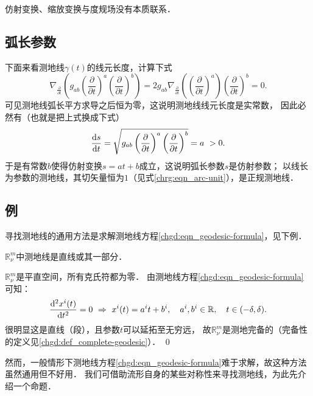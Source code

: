 仿射变换、缩放变换与度规场没有本质联系．

\subsection{弧长参数}
下面来看测地线$\gamma(t)$的线元长度，计算下式
\begin{equation}
    \nabla_{\frac{\partial}{\partial t}} \left(g_{ab} \left(\frac{\partial}{\partial t}\right)^a
    \left(\frac{\partial}{\partial t}\right)^b    \right) =
    2 g_{ab} \nabla_{\frac{\partial}{\partial t}} \left( \left(\frac{\partial}{\partial t}\right)^a \right)
    \left(\frac{\partial}{\partial t}\right)^b     = 0.
\end{equation}
可见测地线弧长平方求导之后恒为零，这说明测地线线元长度是实常数，
因此必然有（也就是把上式换成下式）
\begin{equation}
    \frac{{\rm d}s}{{\rm d}t} =
    \sqrt{g_{ab} \left(\frac{\partial}{\partial t}\right)^a
        \left(\frac{\partial}{\partial t}\right)^b }
    = a \ >0.
\end{equation}
于是有常数$b$使得仿射变换$s=at+b$成立，这说明弧长参数$s$是仿射参数；
以线长为参数的测地线，其切矢量恒为$1$（见式\eqref{chrg:eqn_arc-unit}），是正规测地线．



\subsection{例}
寻找测地线的通用方法是求解测地线方程\eqref{chgd:eqn_geodesic-formula}，见下例．

\begin{example}\label{chgd:exm_Rmnu}
    $\mathbb{R}^m_\nu$中测地线是直线或其一部分．
\end{example}
$\mathbb{R}^m_\nu$是平直空间，所有克氏符都为零．
由测地线方程\eqref{chgd:eqn_geodesic-formula}可知：
\begin{align}
    \frac{{\rm d}^2 x^i(t)}{{\rm d}t^2} = 0     \ \Rightarrow \
    x^i(t) = a^i t + b^i, \quad  a^i, b^i \in \mathbb{R},
    \quad t\in (-\delta,\delta)  .
\end{align}
很明显这是直线（段），且参数$t$可以延拓至无穷远，
故$\mathbb{R}^m_\nu$是测地完备的（完备性的定义见\ref{chgd:def_complete-geodesic}）．
\qed

然而，一般情形下测地线方程\eqref{chgd:eqn_geodesic-formula}难于求解，故这种方法虽然通用但不好用．
我们可借助流形自身的某些对称性来寻找测地线，为此先介绍一个命题．

